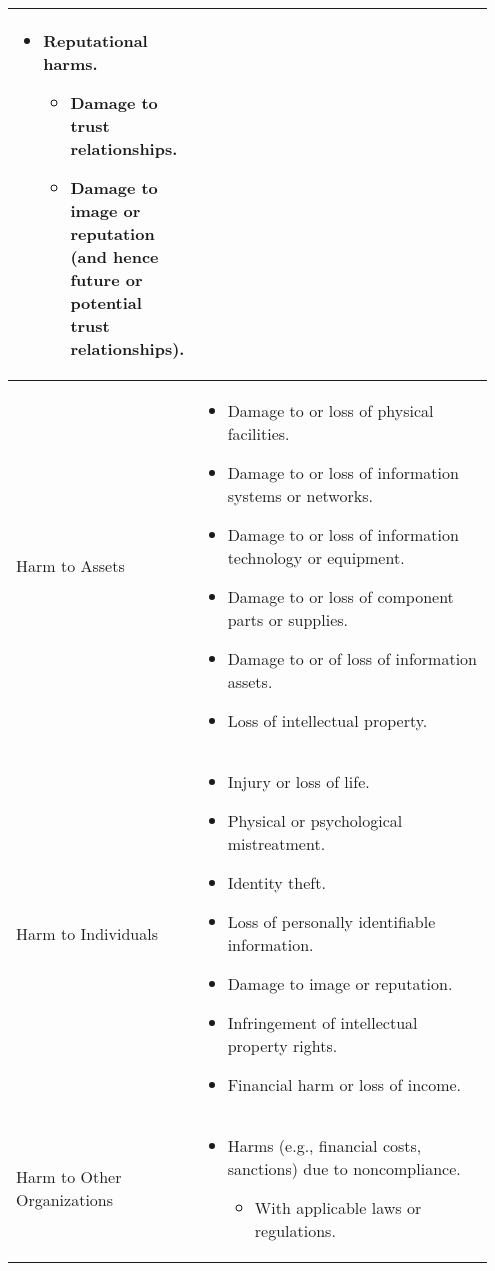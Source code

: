 \documentclass[fleqn]{article}
\begin{document}
\begin{table}[H]
\begin{tabular}{|m{0.20\linewidth} | m{0.75\linewidth}|}
\begin{itemize}[noitemsep]
           		\item Reputational harms.	
           		\begin{itemize}[noitemsep,nolistsep]
           			\item Damage to trust relationships.
           			\item Damage to image or reputation (and hence future or potential trust relationships).
           		\end{itemize}
            \end{itemize} \\
            \hline
            Harm to Assets & 
            \begin{itemize}[noitemsep]
				\item Damage to or loss of physical facilities.
				\item Damage to or loss of information systems or networks.
				\item Damage to or loss of information technology or equipment.
				\item Damage to or loss of component parts or supplies.
				\item Damage to or of loss of information assets.
				\item Loss of intellectual property.            	
            \end{itemize} \\
            \hline
            Harm to Individuals & 
            \begin{itemize}[noitemsep]
				\item Injury or loss of life.
				\item Physical or psychological mistreatment.
				\item Identity theft.
				\item Loss of personally identifiable information.
				\item Damage to image or reputation.
				\item Infringement of intellectual property rights.
				\item Financial harm or loss of income.	
			\end{itemize} \\            
            \hline
            Harm to Other Organizations & 
            \begin{itemize}[noitemsep]
				\item Harms (e.g., financial costs, sanctions) due to noncompliance. 
				\begin{itemize}[noitemsep,nolistsep]
					\item With applicable laws or regulations.

\end{itemize}
\end{itemize}
\end{tabular}
\end{table}
\end{document}
